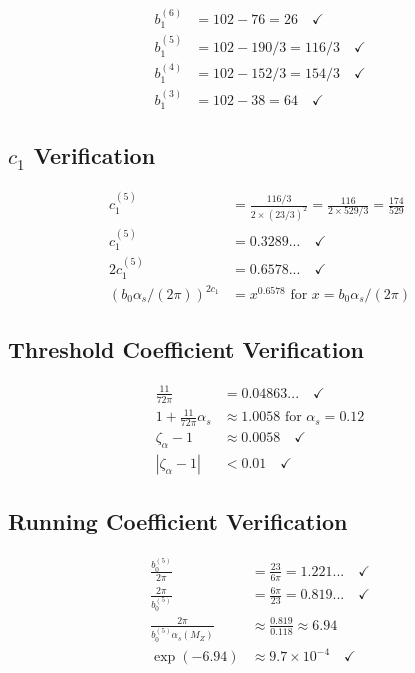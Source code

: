 \documentclass[11pt,a4paper]{article}
\theoremstyle{definition}
\begin{document}
\begin{align}
\label{eq:num-5}
b_1^{(6)} &= 102 - 76 = 26 \quad \checkmark \\
\label{eq:num-6}
b_1^{(5)} &= 102 - 190/3 = 116/3 \quad \checkmark \\
\label{eq:num-7}
b_1^{(4)} &= 102 - 152/3 = 154/3 \quad \checkmark \\
\label{eq:num-8}
b_1^{(3)} &= 102 - 38 = 64 \quad \checkmark
\end{align}

\subsection{$c_1$ Verification}
\label{subsec:num-c1}

\begin{align}
\label{eq:num-9}
c_1^{(5)} &= \frac{116/3}{2 \times (23/3)^2} = \frac{116}{2 \times 529/3} = \frac{174}{529} \\
\label{eq:num-10}
c_1^{(5)} &= 0.3289... \quad \checkmark \\
\label{eq:num-11}
2c_1^{(5)} &= 0.6578... \quad \checkmark \\
\label{eq:num-12}
(b_0\alpha_s/(2\pi))^{2c_1} &= x^{0.6578} \text{ for } x = b_0\alpha_s/(2\pi)
\end{align}

\subsection{Threshold Coefficient Verification}
\label{subsec:num-thresh}

\begin{align}
\label{eq:num-13}
\frac{11}{72\pi} &= 0.04863... \quad \checkmark \\
\label{eq:num-14}
1 + \frac{11}{72\pi}\alpha_s &\approx 1.0058 \text{ for } \alpha_s = 0.12 \\
\label{eq:num-15}
\zeta_\alpha - 1 &\approx 0.0058 \quad \checkmark \\
\label{eq:num-16}
|\zeta_\alpha - 1| &< 0.01 \quad \checkmark
\end{align}

\subsection{Running Coefficient Verification}
\label{subsec:num-running}

\begin{align}
\label{eq:num-17}
\frac{b_0^{(5)}}{2\pi} &= \frac{23}{6\pi} = 1.221... \quad \checkmark \\
\label{eq:num-18}
\frac{2\pi}{b_0^{(5)}} &= \frac{6\pi}{23} = 0.819... \quad \checkmark \\
\label{eq:num-19}
\frac{2\pi}{b_0^{(5)}\alpha_s(M_Z)} &\approx \frac{0.819}{0.118} \approx 6.94 \\
\label{eq:num-20}
\exp(-6.94) &\approx 9.7 \times 10^{-4} \quad \checkmark
\end{align}
\end{document}
